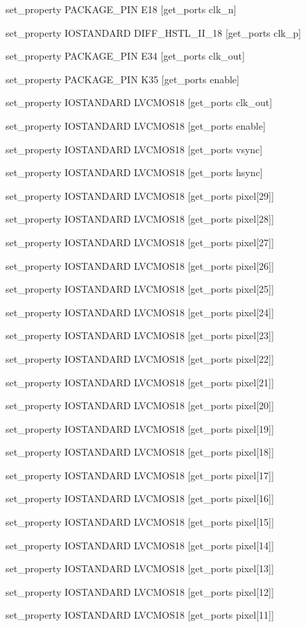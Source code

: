set\_property PACKAGE\_PIN E18 [get\_ports clk\_n]

set\_property IOSTANDARD DIFF\_HSTL\_II\_18 [get\_ports clk\_p]

set\_property PACKAGE\_PIN E34 [get\_ports clk\_out]

set\_property PACKAGE\_PIN K35 [get\_ports enable]

set\_property IOSTANDARD LVCMOS18 [get\_ports clk\_out]

set\_property IOSTANDARD LVCMOS18 [get\_ports enable]

set\_property IOSTANDARD LVCMOS18 [get\_ports vsync]

set\_property IOSTANDARD LVCMOS18 [get\_ports hsync]

set\_property IOSTANDARD LVCMOS18 [get\_ports {pixel[29]}]

set\_property IOSTANDARD LVCMOS18 [get\_ports {pixel[28]}]

set\_property IOSTANDARD LVCMOS18 [get\_ports {pixel[27]}]

set\_property IOSTANDARD LVCMOS18 [get\_ports {pixel[26]}]

set\_property IOSTANDARD LVCMOS18 [get\_ports {pixel[25]}]

set\_property IOSTANDARD LVCMOS18 [get\_ports {pixel[24]}]

set\_property IOSTANDARD LVCMOS18 [get\_ports {pixel[23]}]

set\_property IOSTANDARD LVCMOS18 [get\_ports {pixel[22]}]

set\_property IOSTANDARD LVCMOS18 [get\_ports {pixel[21]}]

set\_property IOSTANDARD LVCMOS18 [get\_ports {pixel[20]}]

set\_property IOSTANDARD LVCMOS18 [get\_ports {pixel[19]}]

set\_property IOSTANDARD LVCMOS18 [get\_ports {pixel[18]}]

set\_property IOSTANDARD LVCMOS18 [get\_ports {pixel[17]}]

set\_property IOSTANDARD LVCMOS18 [get\_ports {pixel[16]}]

set\_property IOSTANDARD LVCMOS18 [get\_ports {pixel[15]}]

set\_property IOSTANDARD LVCMOS18 [get\_ports {pixel[14]}]

set\_property IOSTANDARD LVCMOS18 [get\_ports {pixel[13]}]

set\_property IOSTANDARD LVCMOS18 [get\_ports {pixel[12]}]

set\_property IOSTANDARD LVCMOS18 [get\_ports {pixel[11]}]

